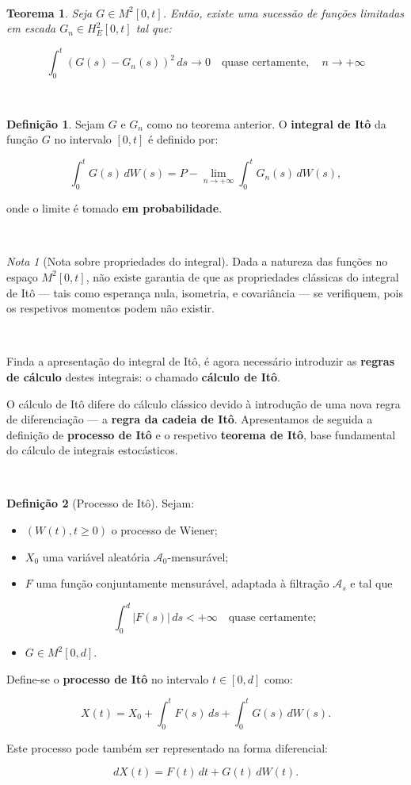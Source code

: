 \documentclass[
  11pt,
  a4paper,
]{book}
\newtheorem{theorem}{Teorema}[chapter]
\theoremstyle{definition}
\newtheorem{definition}{Definição}[chapter]
\theoremstyle{definition}
\theoremstyle{definition}
\theoremstyle{definition}
\theoremstyle{remark}
\newtheorem*{remark}{Nota }
\begin{document}
\(\,\)

\begin{theorem}
Seja \(G \in M^2[0,t]\). Então, existe uma sucessão de funções limitadas em escada \(G_n \in H_E^2[0,t]\) tal que:

\[
\int_0^t (G(s) - G_n(s))^2 \, ds \to 0 \quad \text{quase certamente}, \quad n \to +\infty
\]
\end{theorem}

\(\,\)

\begin{definition}
Sejam \(G\) e \(G_n\) como no teorema anterior. O \textbf{integral de Itô} da função \(G\) no intervalo \([0,t]\) é definido por:

\[
\int_0^t G(s) \, dW(s) = P-\lim_{n \to +\infty} \int_0^t G_n(s) \, dW(s),
\]

onde o limite é tomado \textbf{em probabilidade}.
\end{definition}

\(\,\)

\begin{remark}[Nota sobre propriedades do integral]
Dada a natureza das funções no espaço \(M^2[0,t]\), não existe garantia de que as propriedades clássicas do integral de Itô --- tais como esperança nula, isometria, e covariância --- se verifiquem, pois os respetivos momentos podem não existir.
\end{remark}

\(\,\)

Finda a apresentação do integral de Itô, é agora necessário introduzir as \textbf{regras de cálculo} destes integrais: o chamado \textbf{cálculo de Itô}.

O cálculo de Itô difere do cálculo clássico devido à introdução de uma nova regra de diferenciação --- a \textbf{regra da cadeia de Itô}. Apresentamos de seguida a definição de \textbf{processo de Itô} e o respetivo \textbf{teorema de Itô}, base fundamental do cálculo de integrais estocásticos.

\(\,\)

\begin{definition}[Processo de Itô]
Sejam:

\begin{itemize}
\item
  \((W(t), t \geq 0)\) o processo de Wiener;
\item
  \(X_0\) uma variável aleatória \(\mathcal{A}_0\)-mensurável;
\item
  \(F\) uma função conjuntamente mensurável, adaptada à filtração \(\mathcal{A}_s\) e tal que

  \[
  \int_0^d |F(s)| \, ds < +\infty \quad \text{quase certamente};
  \]
\item
  \(G \in M^2[0,d]\).
\end{itemize}

Define-se o \textbf{processo de Itô} no intervalo \(t \in [0,d]\) como:

\[
X(t) = X_0 + \int_0^t F(s) \, ds + \int_0^t G(s) \, dW(s).
\]

Este processo pode também ser representado na forma diferencial:

\[
dX(t) = F(t) \, dt + G(t) \, dW(t).
\]
\end{definition}
\end{document}
